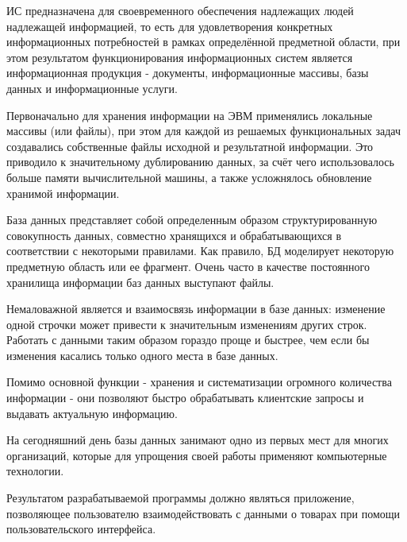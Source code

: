 ИС предназначена для своевременного обеспечения надлежащих людей надлежащей информацией,
то есть для удовлетворения конкретных информационных потребностей в рамках определённой
предметной области, при этом результатом функционирования информационных систем является
информационная продукция - документы, информационные массивы, базы данных и информационные услуги.

Первоначально для хранения информации на ЭВМ применялись локальные массивы (или файлы),
при этом для каждой из решаемых функциональных задач создавались собственные файлы исходной
и результатной информации. Это приводило к значительному дублированию данных,
за счёт чего использовалось больше памяти вычислительной машины,
а также усложнялось обновление хранимой информации.

База данных представляет собой определенным образом структурированную совокупность данных,
совместно хранящихся и обрабатывающихся в соответствии с некоторыми правилами.
Как правило, БД моделирует некоторую предметную область или ее фрагмент.
Очень часто в качестве постоянного хранилища информации баз данных выступают файлы.

Немаловажной является и взаимосвязь информации в базе данных: изменение одной строчки
может привести к значительным изменениям других строк.
Работать с данными таким образом гораздо проще и быстрее,
чем если бы изменения касались только одного места в базе данных.

Помимо основной функции - хранения и систематизации огромного количества информации - они
позволяют быстро обрабатывать клиентские запросы и выдавать актуальную информацию.

На сегодняшний день базы данных занимают одно из первых мест для многих организаций,
которые для упрощения своей работы применяют компьютерные технологии.

Результатом разрабатываемой программы должно являться приложение,
позволяющее пользователю взаимодействовать с данными о товарах при помощи пользовательского интерфейса.

\newpage
